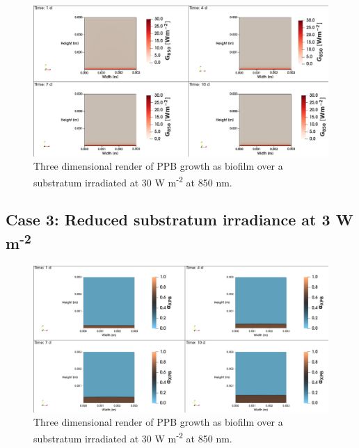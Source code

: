 \begin{figure}[H]
    \centering
    \includegraphics[width=\textwidth,height=0.4\textheight]{Chap4/results/post_processing/2D_cases/case2_rad.png}
    \caption{Three dimensional render of PPB growth as biofilm over a substratum irradiated at 30 W m\textsuperscript{-2} at 850 nm. } 
    \label{fig:case5_3D_rad}
\end{figure}


\subsection{Case 3: Reduced substratum irradiance at 3 W m\textsuperscript{-2}}
\begin{figure}[H]
    \centering
    \includegraphics[width=\textwidth,height=0.4\textheight]{Chap4/results/post_processing/2D_cases/case3_ppb.png}
    \caption{Three dimensional render of PPB growth as biofilm over a substratum irradiated at 30 W m\textsuperscript{-2} at 850 nm. } 
    \label{fig:case5_3D_rad}
\end{figure}

